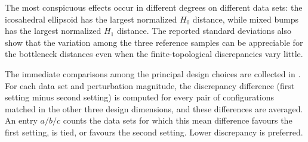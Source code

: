 \documentclass[a4paper,11pt]{article}
\theoremstyle{definition}
\theoremstyle{remark}
\begin{document}
The most conspicuous effects occur in different degrees on different data sets: the icosahedral ellipsoid has the largest normalized $H_0$ distance, while mixed bumps has the largest normalized $H_1$ distance. The reported standard deviations also show that the variation among the three reference samples can be appreciable for the bottleneck distances even when the finite-topological discrepancies vary little.

The immediate comparisons among the principal design choices are collected in . For each data set and perturbation magnitude, the discrepancy difference (first setting minus second setting) is computed for every pair of configurations matched in the other three design dimensions, and these differences are averaged. An entry $a/b/c$ counts the data sets for which this mean difference favours the first setting, is tied, or favours the second setting. Lower discrepancy is preferred.
\end{document}
